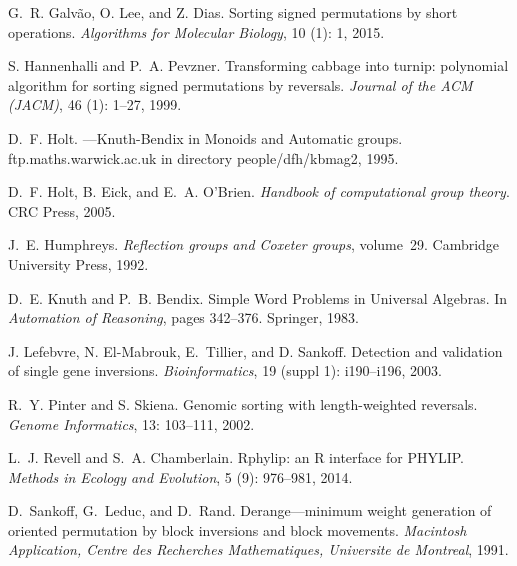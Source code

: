 \documentclass[utf8]{Frontiers_LaTex_Templates/frontiersFPHY} %
\numberwithin{equation}{section}
\begin{document}
\begin{thebibliography}{38}
G.~R. Galv{\~a}o, O. Lee, and Z. Dias.
\newblock Sorting signed permutations by short operations.
\newblock \emph{Algorithms for Molecular Biology}, 10 (1): 1,
  2015.

S. Hannenhalli and P.~A. Pevzner.
\newblock Transforming cabbage into turnip: polynomial algorithm for sorting
  signed permutations by reversals.
\newblock \emph{Journal of the ACM (JACM)}, 46 (1): 1--27,
  1999.

D.~F. Holt.
---{K}nuth-{B}endix in {M}onoids and {A}utomatic groups.
\newblock ftp.maths.warwick.ac.uk in directory people/dfh/kbmag2, 1995.

D.~F. Holt, B. Eick, and E.~A. O'Brien.
\newblock \emph{Handbook of computational group theory}.
\newblock CRC Press, 2005.

J.~E. Humphreys.
\newblock \emph{Reflection groups and Coxeter groups}, volume~29.
\newblock Cambridge University Press, 1992.

D.~E. Knuth and P.~B. Bendix.
\newblock Simple {W}ord {P}roblems in {U}niversal {A}lgebras.
\newblock In \emph{Automation of Reasoning}, pages 342--376. Springer, 1983.

J. Lefebvre, N. El-Mabrouk, E.~Tillier, and D. Sankoff.
\newblock Detection and validation of single gene inversions.
\newblock \emph{Bioinformatics}, 19 (suppl 1): i190--i196,
  2003.

R.~Y. Pinter and S. Skiena.
\newblock Genomic sorting with length-weighted reversals.
\newblock \emph{Genome Informatics}, 13: 103--111, 2002.

L.~J. Revell and S.~A. Chamberlain.
\newblock Rphylip: an {R} interface for {PHYLIP}.
\newblock \emph{Methods in Ecology and Evolution}, 5 (9):
  976--981, 2014.

D.~Sankoff, G.~Leduc, and D.~Rand.
\newblock Derange---minimum weight generation of oriented permutation by block
  inversions and block movements.
\newblock \emph{Macintosh Application, Centre des Recherches Mathematiques,
  Universite de Montreal}, 1991.


\end{thebibliography}
\end{document}
